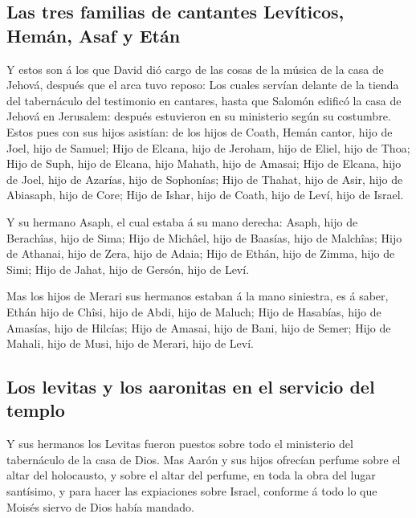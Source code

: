 \hypertarget{las-tres-familias-de-cantantes-levuxedticos-hemuxe1n-asaf-y-etuxe1n}{%
\subsection{Las tres familias de cantantes Levíticos, Hemán, Asaf y
Etán}\label{las-tres-familias-de-cantantes-levuxedticos-hemuxe1n-asaf-y-etuxe1n}}

 Y estos son á los que David dió cargo de las cosas de la
música de la casa de Jehová, después que el arca tuvo reposo:
 Los cuales servían delante de la tienda del tabernáculo
del testimonio en cantares, hasta que Salomón edificó la casa de Jehová
en Jerusalem: después estuvieron en su ministerio según su costumbre.
 Estos pues con sus hijos asistían: de los hijos de Coath,
Hemán cantor, hijo de Joel, hijo de Samuel;  Hijo de
Elcana, hijo de Jeroham, hijo de Eliel, hijo de Thoa;  Hijo
de Suph, hijo de Elcana, hijo Mahath, hijo de Amasai;  Hijo
de Elcana, hijo de Joel, hijo de Azarías, hijo de Sophonías;
 Hijo de Thahat, hijo de Asir, hijo de Abiasaph, hijo de
Core;  Hijo de Ishar, hijo de Coath, hijo de Leví, hijo de
Israel.

 Y su hermano Asaph, el cual estaba á su mano derecha:
Asaph, hijo de Berachîas, hijo de Sima;  Hijo de Michâel,
hijo de Baasías, hijo de Malchîas;  Hijo de Athanai, hijo
de Zera, hijo de Adaia;  Hijo de Ethán, hijo de Zimma, hijo
de Simi;  Hijo de Jahat, hijo de Gersón, hijo de Leví.

 Mas los hijos de Merari sus hermanos estaban á la mano
siniestra, es á saber, Ethán hijo de Chîsi, hijo de Abdi, hijo de
Maluch;  Hijo de Hasabías, hijo de Amasías, hijo de
Hilcías;  Hijo de Amasai, hijo de Bani, hijo de Semer;
 Hijo de Mahali, hijo de Musi, hijo de Merari, hijo de
Leví.

\hypertarget{los-levitas-y-los-aaronitas-en-el-servicio-del-templo}{%
\subsection{Los levitas y los aaronitas en el servicio del
templo}\label{los-levitas-y-los-aaronitas-en-el-servicio-del-templo}}

 Y sus hermanos los Levitas fueron puestos sobre todo el
ministerio del tabernáculo de la casa de Dios.  Mas Aarón y
sus hijos ofrecían perfume sobre el altar del holocausto, y sobre el
altar del perfume, en toda la obra del lugar santísimo, y para hacer las
expiaciones sobre Israel, conforme á todo lo que Moisés siervo de Dios
había mandado.

